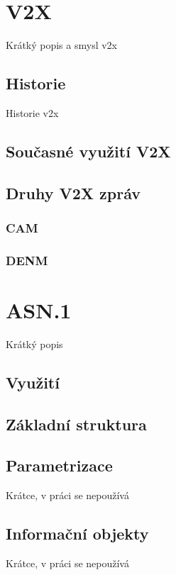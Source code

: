 \chapter{V2X}
Krátký popis a smysl v2x

\section{Historie}
Historie v2x

\section{Současné využití V2X}


\section{Druhy V2X zpráv}

\subsection{CAM}

\subsection{DENM}

\chapter{ASN.1}
Krátký popis

\section{Využití}

\section{Základní struktura}

\section{Parametrizace}
Krátce, v práci se nepoužívá

\section{Informační objekty}
Krátce, v práci se nepoužívá


